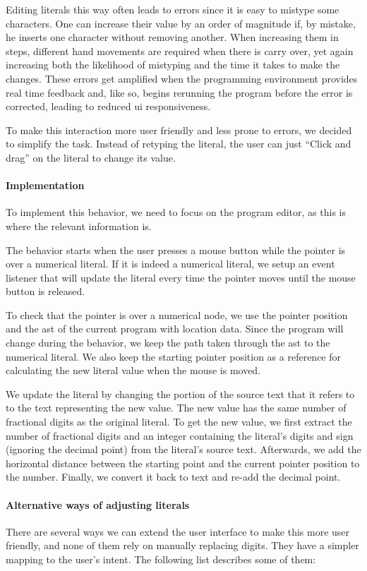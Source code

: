 Editing literals this way often leads to errors since it is easy to mistype some characters.
One can increase their value by an order of magnitude if, by mistake, he inserts one character without removing another.
When increasing them in steps, different hand movements are required when there is carry over, yet again increasing both the likelihood of mistyping and the time it takes to make the changes.
These errors get amplified when the programming environment provides real time feedback and, like so, begins rerunning the program before the error is corrected, leading to reduced \gls{ui} responsiveness.

To make this interaction more user friendly and less prone to errors, we decided to simplify the task.
Instead of retyping the literal, the user can just ``Click and drag'' on the literal to change its value.

\paragraph{Implementation}
To implement this behavior, we need to focus on the program editor, as this is where the relevant information is.

The behavior starts when the user presses a mouse button while the pointer is over a numerical literal.
If it is indeed a numerical literal, we setup an event listener that will update the literal every time the pointer moves until the mouse button is released.

To check that the pointer is over a numerical node, we use the pointer position and the \gls{ast} of the current program with location data.
Since the program will change during the behavior, we keep the path taken through the \gls{ast} to the numerical literal.
We also keep the starting pointer position as a reference for calculating the new literal value when the mouse is moved.

We update the literal by changing the portion of the source text that it refers to to the text representing the new value.
The new value has the same number of fractional digits as the original literal.
To get the new value, we first extract the number of fractional digits and an integer containing the literal's digits and sign (ignoring the decimal point) from the literal's source text.
Afterwards, we add the horizontal distance between the starting point and the current pointer position to the number.
Finally, we convert it back to text and re-add the decimal point.

\paragraph{Alternative ways of adjusting literals}
There are several ways we can extend the user interface to make this more user friendly, and none of them rely on manually replacing digits.
They have a simpler mapping to the user's intent.
The following list describes some of them:

